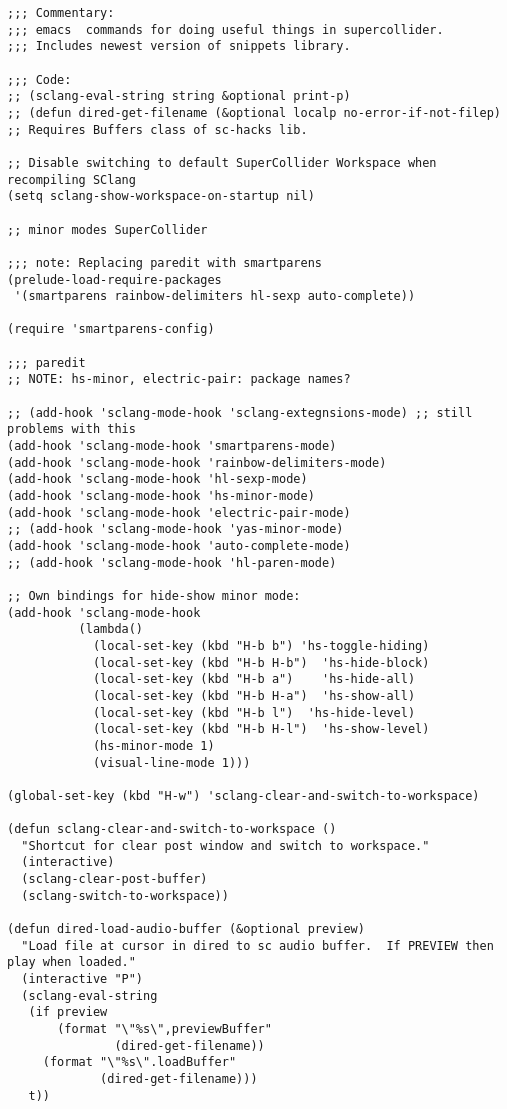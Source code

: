 \documentclass[11pt]{article}
\begin{document}
\begin{verbatim}
;;; Commentary:
;;; emacs  commands for doing useful things in supercollider.
;;; Includes newest version of snippets library.

;;; Code:
;; (sclang-eval-string string &optional print-p)
;; (defun dired-get-filename (&optional localp no-error-if-not-filep)
;; Requires Buffers class of sc-hacks lib.

;; Disable switching to default SuperCollider Workspace when recompiling SClang
(setq sclang-show-workspace-on-startup nil)

;; minor modes SuperCollider

;;; note: Replacing paredit with smartparens
(prelude-load-require-packages
 '(smartparens rainbow-delimiters hl-sexp auto-complete))

(require 'smartparens-config)

;;; paredit
;; NOTE: hs-minor, electric-pair: package names?

;; (add-hook 'sclang-mode-hook 'sclang-extegnsions-mode) ;; still problems with this
(add-hook 'sclang-mode-hook 'smartparens-mode)
(add-hook 'sclang-mode-hook 'rainbow-delimiters-mode)
(add-hook 'sclang-mode-hook 'hl-sexp-mode)
(add-hook 'sclang-mode-hook 'hs-minor-mode)
(add-hook 'sclang-mode-hook 'electric-pair-mode)
;; (add-hook 'sclang-mode-hook 'yas-minor-mode)
(add-hook 'sclang-mode-hook 'auto-complete-mode)
;; (add-hook 'sclang-mode-hook 'hl-paren-mode)

;; Own bindings for hide-show minor mode:
(add-hook 'sclang-mode-hook
          (lambda()
            (local-set-key (kbd "H-b b") 'hs-toggle-hiding)
            (local-set-key (kbd "H-b H-b")  'hs-hide-block)
            (local-set-key (kbd "H-b a")    'hs-hide-all)
            (local-set-key (kbd "H-b H-a")  'hs-show-all)
            (local-set-key (kbd "H-b l")  'hs-hide-level)
            (local-set-key (kbd "H-b H-l")  'hs-show-level)
            (hs-minor-mode 1)
            (visual-line-mode 1)))

(global-set-key (kbd "H-w") 'sclang-clear-and-switch-to-workspace)

(defun sclang-clear-and-switch-to-workspace ()
  "Shortcut for clear post window and switch to workspace."
  (interactive)
  (sclang-clear-post-buffer)
  (sclang-switch-to-workspace))

(defun dired-load-audio-buffer (&optional preview)
  "Load file at cursor in dired to sc audio buffer.  If PREVIEW then play when loaded."
  (interactive "P")
  (sclang-eval-string
   (if preview
       (format "\"%s\",previewBuffer"
               (dired-get-filename))
     (format "\"%s\".loadBuffer"
             (dired-get-filename)))
   t))


\end{verbatim}
\end{document}
